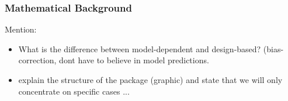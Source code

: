 \documentclass[article]{jss}
\begin{document}
% 
% 
% 
% 
% 
% 

\subsubsection{Mathematical Background}

Mention:
\begin{itemize}
  \item What is the difference between model-dependent and design-based? (bias-correction, dont have to believe in model predictions.
  \item explain the structure of the package (graphic) and state that we will only concentrate on specific cases ...
\end{itemize}
\end{document}

